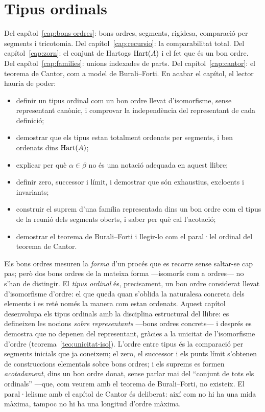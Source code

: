 \chapter{Tipus ordinals}\label{cap:ordinals}

\begin{objectius}
 Del capítol~\ref{cap:bons-ordres}: bons ordres, segments, rigidesa, comparació per segments i tricotomia. Del capítol~\ref{cap:recursio}: la comparabilitat total. Del capítol~\ref{cap:zorn}: el conjunt de Hartogs \(\operatorname{Hart}(A)\) i el fet que és un bon ordre. Del capítol~\ref{cap:families}: unions indexades de parts. Del capítol~\ref{cap:cantor}: el teorema de Cantor, com a model de Burali--Forti.
 En acabar el capítol, el lector hauria de poder:
\begin{itemize}
  \item definir un tipus ordinal com un bon ordre llevat d'isomorfisme, sense representant canònic, i comprovar la independència del representant de cada definició;
  \item demostrar que els tipus estan totalment ordenats per segments, i ben ordenats dins \(\operatorname{Hart}(A)\);
  \item explicar per què \(\alpha\in\beta\) no és una notació adequada en aquest llibre;
  \item definir zero, successor i límit, i demostrar que són exhaustius, excloents i invariants;
  \item construir el suprem d'una família representada dins un bon ordre com el tipus de la reunió dels segments oberts, i saber per què cal l'acotació;
  \item demostrar el teorema de Burali--Forti i llegir-lo com el paral·lel ordinal del teorema de Cantor.
\end{itemize}
\end{objectius}

Els bons ordres mesuren la \emph{forma} d'un procés que es recorre sense
saltar-se cap pas; però dos bons ordres de la mateixa forma ---isomorfs com a
ordres--- no s'han de distingir. El \emph{tipus ordinal} és, precisament, un
bon ordre considerat llevat d'isomorfisme d'ordre: el que queda quan
s'oblida la naturalesa concreta dels elements i es reté només la manera com
estan ordenats. Aquest capítol desenvolupa els tipus ordinals amb la
disciplina estructural del llibre: es defineixen les nocions
\emph{sobre representants} ---bons ordres concrets--- i després es demostra que
no depenen del representant, gràcies a la unicitat de l'isomorfisme d'ordre
(teorema~\ref{teo:unicitat-iso}). L'ordre entre tipus és la comparació per
segments inicials que ja coneixem; el zero, el successor i els punts límit
s'obtenen de construccions elementals sobre bons ordres; i els suprems es
formen \emph{acotadament}, dins un bon ordre donat, sense parlar mai del
\enquote{conjunt de tots els ordinals} ---que, com veurem amb el teorema de
Burali--Forti, no existeix. El paral·lelisme amb el capítol de Cantor és
deliberat: així com no hi ha una mida màxima, tampoc no hi ha una longitud
d'ordre màxima.

